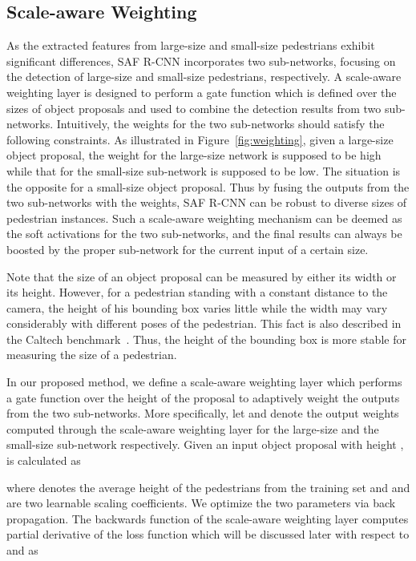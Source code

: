 \documentclass[journal]{IEEEtran}
\begin{document}
\subsection{Scale-aware Weighting}\label{sec:weight}
As the extracted features from large-size and small-size pedestrians exhibit significant differences, SAF R-CNN incorporates two sub-networks, focusing on the detection of large-size and small-size pedestrians, respectively. A scale-aware weighting layer is designed to perform a gate function which is defined over the sizes of object proposals and used to combine the detection results from two sub-networks. Intuitively, the weights for the two sub-networks should satisfy the following constraints. As illustrated in Figure~\ref{fig:weighting}, given a large-size object proposal, the weight for the large-size network is supposed to be high while that for the small-size sub-network is supposed to be low. The situation is the opposite for a small-size object proposal. Thus by fusing the outputs from the two sub-networks with the weights, SAF R-CNN can be robust to diverse sizes of pedestrian instances. Such a scale-aware weighting mechanism can be deemed as the soft activations for the two sub-networks, and the final results can always be boosted by the proper sub-network for the current input of a certain size.



Note that the size of an object proposal can be measured by either its width or its height. However, for a pedestrian standing with a constant distance to the camera, the height of his bounding box varies little while the width may vary considerably with different poses of the pedestrian. This fact is also described in the Caltech benchmark~\cite{dollar2012pedestrian}. Thus, the height of the bounding box is more stable for measuring the size of a pedestrian. 

In our proposed method, we define a scale-aware weighting layer which performs a gate function over the height of the proposal to adaptively weight the outputs from the two sub-networks. More specifically, let  and  denote the output weights computed through the scale-aware weighting layer for the large-size and the small-size sub-network respectively. Given an input object proposal with height ,  is calculated as


where  denotes the average height of the pedestrians from the training set and  and  are two learnable scaling coefficients. We optimize the two parameters via back propagation. The backwards function of the scale-aware weighting layer  computes partial derivative of the loss function  which will be discussed later with respect to  and  as
\end{document}
